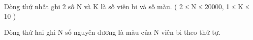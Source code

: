 Dòng thứ nhất ghi 2 số N và K là số viên bi và số màu. ( 2 ≤ N ≤ 20000, 1 ≤ K ≤ 10 )  

   Dòng thứ hai ghi N số nguyên dương là màu của N viên bi theo thứ tự.